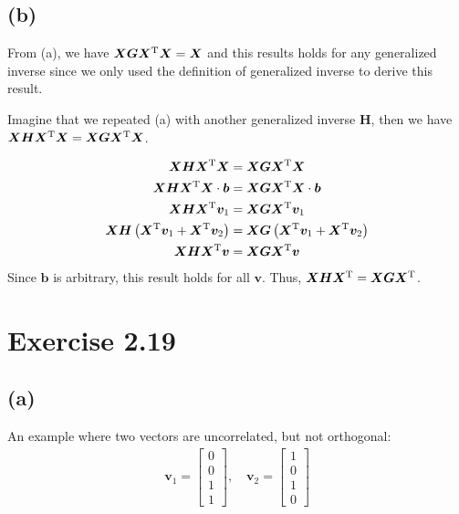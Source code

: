 \documentclass[a4paper]{article}
\begin{document}
\subsection{(b)}
From (a), we have $\bm{X}\bm{G}\bm{X}^{\rm T}\bm{X} = \bm{X}$ and this results holds for any generalized inverse since we only used the definition of generalized inverse to derive this result.

Imagine that we repeated (a) with another generalized inverse $\bm{H}$, then we have $\bm{X}\bm{H}\bm{X}^{\rm T}\bm{X} = \bm{X}\bm{G}\bm{X}^{\rm T}\bm{X}$.

\begin{align*}
\bm{X}\bm{H}\bm{X}^{\rm T}\bm{X} &= \bm{X}\bm{G}\bm{X}^{\rm T}\bm{X}\\
\bm{X}\bm{H}\bm{X}^{\rm T}\bm{X}\cdot\bm{b} &= \bm{X}\bm{G}\bm{X}^{\rm T}\bm{X}\cdot\bm{b}\\
\bm{X}\bm{H}\bm{X}^{\rm T}\bm{v}_{1} &= \bm{X}\bm{G}\bm{X}^{\rm T}\bm{v}_{1}\\
\bm{X}\bm{H}\left(\bm{X}^{\rm T}\bm{v}_{1} + \bm{X}^{\rm T}\bm{v}_{2}\right) &= \bm{X}\bm{G}\left(\bm{X}^{\rm T}\bm{v}_{1} + \bm{X}^{\rm T}\bm{v}_{2}\right)\\
\bm{X}\bm{H}\bm{X}^{\rm T}\bm{v} &= \bm{X}\bm{G}\bm{X}^{\rm T}\bm{v}
\end{align*}
Since $\bm{b}$ is arbitrary, this result holds for all $\bm{v}$. Thus, $\bm{X}\bm{H}\bm{X}^{\rm T} = \bm{X}\bm{G}\bm{X}^{\rm T}$.

\vspace{\baselineskip}
\section{Exercise 2.19}

\subsection{(a)}

An example where two vectors are uncorrelated, but not orthogonal:
\begin{align*}
\bm{v}_{1} = 
\begin{bmatrix}
0\\
0\\
1\\
1
\end{bmatrix}
, \quad
\bm{v}_{2} = 
\begin{bmatrix}
1\\
0\\
1\\
0
\end{bmatrix}
\end{align*}
\end{document}
